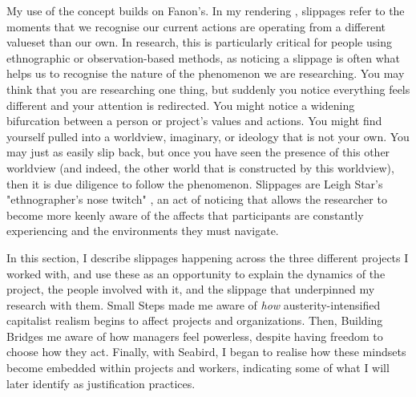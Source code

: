 My use of the concept builds on Fanon's. In my rendering \citep{cutting_making_2021}, slippages refer to the moments that we recognise our current actions are operating from a different valueset than our own. In research, this is particularly critical for people using ethnographic or observation-based methods, as noticing a slippage is often what helps us to recognise the nature of the phenomenon we are researching. You may think that you are researching one thing, but suddenly you notice everything feels different and your attention is redirected. You might notice a widening bifurcation between a person or project's values and actions. You might find yourself pulled into a worldview, imaginary, or ideology that is not your own. You may just as easily slip back, but once you have seen the presence of this other worldview (and indeed, the other world that is constructed by this worldview), then it is due diligence to follow the phenomenon. Slippages are Leigh Star's "ethnographer's nose twitch" \citep[p. 610]{leigh_star_this_2010}, an act of noticing that allows the researcher to become more keenly aware of the affects that participants are constantly experiencing and the environments they must navigate. 

In this section, I describe slippages happening across the three different projects I worked with, and use these as an opportunity to explain the dynamics of the project, the people involved with it, and the slippage that underpinned my research with them. Small Steps made me aware of \textit{how} austerity-intensified capitalist realism begins to affect projects and organizations. Then,  Building Bridges me aware of how managers feel powerless, despite having freedom to choose how they act. Finally, with Seabird, I began to realise how these mindsets become embedded within projects and workers, indicating some of what I will later identify as justification practices. 

